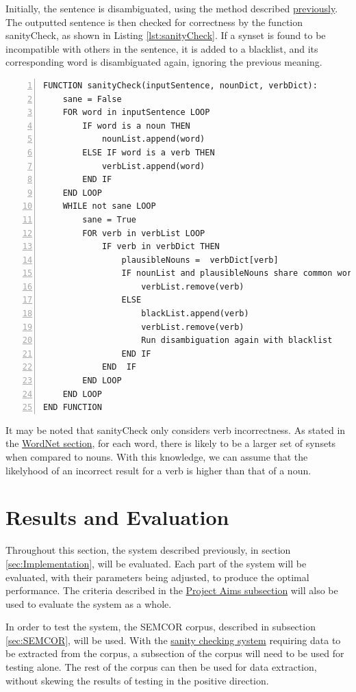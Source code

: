 \documentclass[]{article}
\begin{document}
Initially, the sentence is disambiguated, using the method described \hyperref[sec:ImplementedDisambiguation]{previously}. The outputted sentence is then checked for correctness by the function sanityCheck, as shown in Listing \ref{lst:sanityCheck}. If a synset is found to be incompatible with others in the sentence, it is added to a blacklist, and its corresponding word is disambiguated again, ignoring the previous meaning.

\begin{lstlisting}[numbers=left, numberstyle=\small, caption={The sanityCheck function}, captionpos=b, label={lst:sanityCheck}]
FUNCTION sanityCheck(inputSentence, nounDict, verbDict):
    sane = False
    FOR word in inputSentence LOOP
        IF word is a noun THEN
            nounList.append(word)
        ELSE IF word is a verb THEN
            verbList.append(word)
        END IF
    END LOOP
    WHILE not sane LOOP
        sane = True
        FOR verb in verbList LOOP
            IF verb in verbDict THEN
                plausibleNouns =  verbDict[verb]
                IF nounList and plausibleNouns share common words THEN
                    verbList.remove(verb)
                ELSE
                    blackList.append(verb)
                    verbList.remove(verb)
                    Run disambiguation again with blacklist
                END IF
            END  IF
		END LOOP
	END LOOP
END FUNCTION
\end{lstlisting}

It may be noted that sanityCheck only considers verb incorrectness. As stated in the \hyperref[Verbs]{WordNet section}, for each word, there is likely to be a larger set of synsets when compared to nouns. With this knowledge, we can assume that the likelyhood of an incorrect result for a verb is higher than that of a noun. 



\section{Results and Evaluation}
\label{sec:EvResults}
Throughout this section, the system described previously, in section \ref{sec:Implementation}, will be evaluated. Each part of the system will be evaluated, with their parameters being adjusted, to produce the optimal performance. The criteria described in the \hyperref[sec:ProjectAim]{Project Aims subsection} will also be used to evaluate the system as a whole.

In order to test the system, the SEMCOR corpus, described in subsection \ref{sec:SEMCOR}, will be used. With the \hyperref[sec:Sanity]{sanity checking system} requiring data to be extracted from the corpus, a subsection of the corpus will need to be used for testing alone. The rest of the corpus can then be used for data extraction, without skewing the results of testing in the positive direction.
\end{document}
